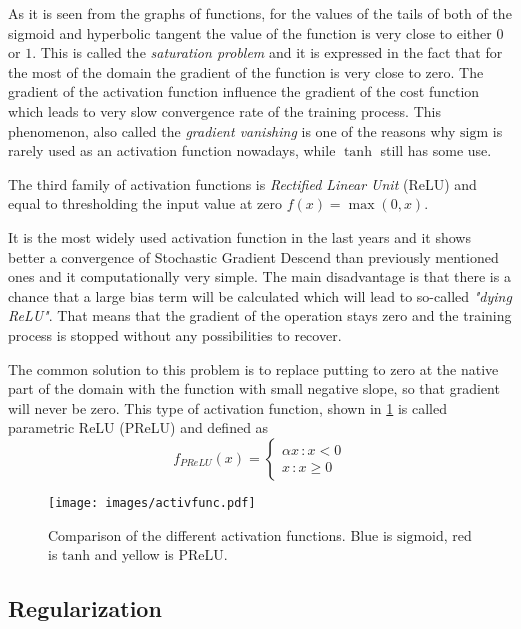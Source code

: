 As it is seen from the graphs of functions, for the values of the tails of both of the sigmoid and hyperbolic tangent the value of the function is very close to either $0$ or $1$.
This is called the \textit{saturation problem} and it is expressed in the fact that for the most of the domain the gradient of the function is very close to zero.
The gradient of the activation function influence the gradient of the cost function which leads to very slow convergence rate of the training process.
This phenomenon, also called the \textit{gradient vanishing} is one of the reasons why $\mathrm{sigm}$ is rarely used as an activation function nowadays, while $\tanh$ still has some use.
\medskip

The third family of activation functions is \textit{Rectified Linear Unit} (ReLU) and equal to thresholding the input value at zero $f(x)=\max(0,x)$. 
\medskip

It is the most widely used activation function in the last years and it shows better a convergence of Stochastic Gradient Descend than previously mentioned ones and it computationally very simple.
The main disadvantage is that there is a chance that a large bias term will be calculated which will lead to so-called \textit{"dying ReLU"}. 
That means that the gradient of the operation stays zero and the training process is stopped without any possibilities to recover. 
\medskip

The common solution to this problem is to replace putting to zero at the native part of the domain with the function with small negative slope, so that gradient will never be zero. 
This type of activation function, shown in \ref{fig:act_func} is called parametric ReLU (PReLU) and defined as  
\[ f_{PReLU}(x) = 
\begin{cases}
	\alpha x \, :x<0 \\
	x \, : x \geq 0
\end{cases}
\]

\begin{figure}[]
	\centering
	\texttt{[image: images/activfunc.pdf]}
	\caption{Comparison of the different activation functions. Blue is $\mathrm{sigmoid}$, red is $\mathrm{tanh}$ and yellow is $\mathrm{PReLU}$.}
	\label{fig:act_func}
\end{figure}


\subsection{Regularization}


